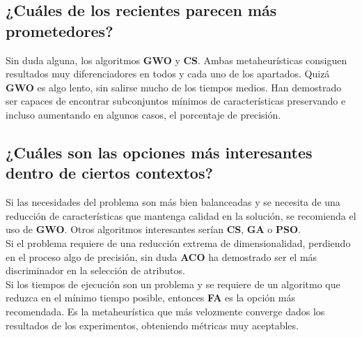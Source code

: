 \subsection{¿Cuáles de los recientes parecen más prometedores?}
Sin duda alguna, los algoritmos \textbf{GWO} y \textbf{CS}. Ambas metaheurísticas consiguen resultados muy diferenciadores en todos y cada uno de los apartados. Quizá \textbf{GWO} es algo lento, sin salirse mucho de los tiempos medios. Han demostrado ser capaces de encontrar subconjuntos mínimos de características preservando e incluso aumentando en algunos casos, el porcentaje de precisión.
\subsection{¿Cuáles son las opciones más interesantes dentro de ciertos contextos?}
Si las necesidades del problema son más bien balanceadas y se necesita de una reducción de características que mantenga calidad en la solución, se recomienda el uso de \textbf{GWO}. Otros algoritmos interesantes serían \textbf{CS}, \textbf{GA} o \textbf{PSO}.\\[6pt]
Si el problema requiere de una reducción extrema de dimensionalidad, perdiendo en el proceso algo de precisión, sin duda \textbf{ACO} ha demostrado ser el más discriminador en la selección de atributos.\\[6pt]
Si los tiempos de ejecución son un problema y se requiere de un algoritmo que reduzca en el mínimo tiempo posible, entonces \textbf{FA} es la opción más recomendada. Es la metaheurística que más velozmente converge dados los resultados de los experimentos, obteniendo métricas muy aceptables.